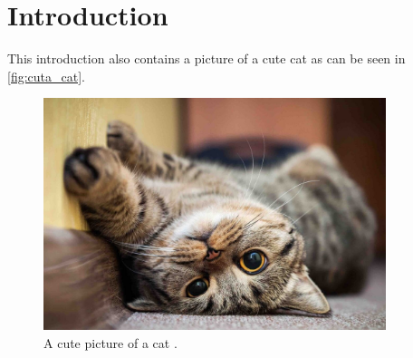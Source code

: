 \chapter{Introduction}
\label{Ch_Introduction}
This introduction also contains a picture of a cute cat as can be seen in \autoref{fig:cuta_cat}.

\begin{figure}[H]
    \centering
    \includegraphics[width= 100mm]{figures/cat3.jpg}
    \caption{A cute picture of a cat \cite{cutecat}.}
    \label{fig:cuta_cat}
\end{figure}

\lipsum[1]